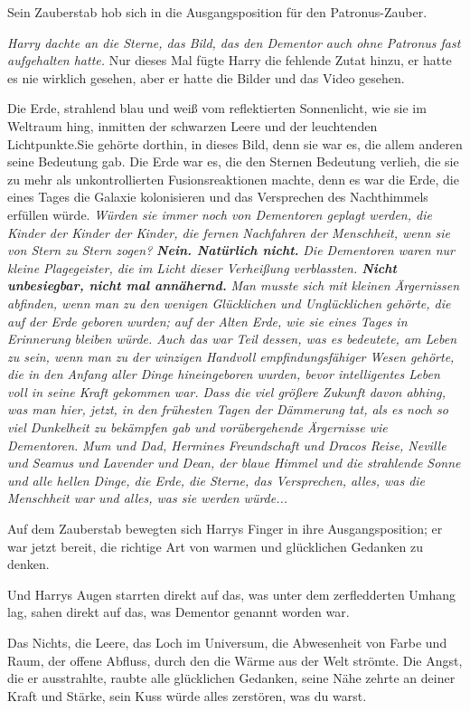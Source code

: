 Sein Zauberstab hob sich in die Ausgangsposition für den Patronus-Zauber.

\emph{Harry dachte an die Sterne, das Bild, das den Dementor auch ohne Patronus
fast aufgehalten hatte.} Nur dieses Mal fügte Harry die fehlende Zutat hinzu, er
hatte es nie wirklich gesehen, aber er hatte die Bilder und das Video gesehen.

Die Erde, strahlend blau und weiß vom reflektierten Sonnenlicht, wie sie im
Weltraum hing, inmitten der schwarzen Leere und der leuchtenden Lichtpunkte.Sie
gehörte dorthin, in dieses Bild, denn sie war es, die allem anderen seine
Bedeutung gab. Die Erde war es, die den Sternen Bedeutung verlieh, die sie zu
mehr als unkontrollierten Fusionsreaktionen machte, denn es war die Erde, die
eines Tages die Galaxie kolonisieren und das Versprechen des Nachthimmels
erfüllen würde. \emph{ Würden sie immer noch von Dementoren geplagt werden, die
Kinder der Kinder der Kinder, die fernen Nachfahren der Menschheit, wenn sie von
Stern zu Stern zogen?} \emph{\textbf{Nein. Natürlich nicht.} } \emph{Die
Dementoren waren nur kleine Plagegeister, die im Licht dieser Verheißung
verblassten. \textbf{Nicht unbesiegbar, nicht mal annähernd.}} \emph{Man musste
sich mit kleinen Ärgernissen abfinden, wenn man zu den wenigen Glücklichen und
Unglücklichen gehörte, die auf der Erde geboren wurden; auf der Alten Erde, wie
sie eines Tages in Erinnerung bleiben würde. Auch das war Teil dessen, was es
bedeutete, am Leben zu sein, wenn man zu der winzigen Handvoll
empfindungsfähiger Wesen gehörte, die in den Anfang aller Dinge hineingeboren
wurden, bevor intelligentes Leben voll in seine Kraft gekommen war. Dass die
viel größere Zukunft davon abhing, was man hier, jetzt, in den frühesten Tagen
der Dämmerung tat, als es noch so viel Dunkelheit zu bekämpfen gab und
vorübergehende Ärgernisse wie Dementoren.} \emph{ Mum und Dad, Hermines
Freundschaft und Dracos Reise, Neville und Seamus und Lavender und Dean, der
blaue Himmel und die strahlende Sonne und alle hellen Dinge, die Erde, die
Sterne, das Versprechen, alles, was die Menschheit war und alles, was sie werden
würde...}

Auf dem Zauberstab bewegten sich Harrys Finger in ihre Ausgangsposition; er
war jetzt bereit, die richtige Art von warmen und glücklichen Gedanken zu
denken.

Und Harrys Augen starrten direkt auf das, was unter dem zerfledderten Umhang
lag, sahen direkt auf das, was Dementor genannt worden war.

Das Nichts, die Leere, das Loch im Universum, die Abwesenheit von Farbe und
Raum, der offene Abfluss, durch den die Wärme aus der Welt strömte. Die Angst,
die er ausstrahlte, raubte alle glücklichen Gedanken, seine Nähe zehrte an
deiner Kraft und Stärke, sein Kuss würde alles zerstören, was du warst.

